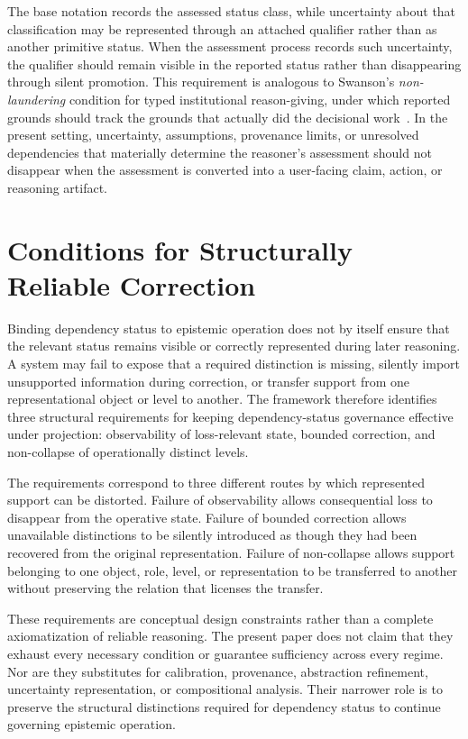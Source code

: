 \documentclass[11pt]{article}
\theoremstyle{definition}
\theoremstyle{remark}
\begin{document}
The base notation records the assessed status class, while uncertainty about that classification may be represented through an attached qualifier rather than as another primitive status. When the assessment process records such uncertainty, the qualifier should remain visible in the reported status rather than disappearing through silent promotion. This requirement is analogous to Swanson's \emph{non-laundering} condition for typed institutional reason-giving, under which reported grounds should track the grounds that actually did the decisional work~\cite{Swanson2026Typed}. In the present setting, uncertainty, assumptions, provenance limits, or unresolved dependencies that materially determine the reasoner's assessment should not disappear when the assessment is converted into a user-facing claim, action, or reasoning artifact.

\section{Conditions for Structurally Reliable Correction}

Binding dependency status to epistemic operation does not by itself ensure that the relevant status remains visible or correctly represented during later reasoning. A system may fail to expose that a required distinction is missing, silently import unsupported information during correction, or transfer support from one representational object or level to another. The framework therefore identifies three structural requirements for keeping dependency-status governance effective under projection: observability of loss-relevant state, bounded correction, and non-collapse of operationally distinct levels.

The requirements correspond to three different routes by which represented support can be distorted. Failure of observability allows consequential loss to disappear from the operative state. Failure of bounded correction allows unavailable distinctions to be silently introduced as though they had been recovered from the original representation. Failure of non-collapse allows support belonging to one object, role, level, or representation to be transferred to another without preserving the relation that licenses the transfer.

These requirements are conceptual design constraints rather than a complete axiomatization of reliable reasoning. The present paper does not claim that they exhaust every necessary condition or guarantee sufficiency across every regime. Nor are they substitutes for calibration, provenance, abstraction refinement, uncertainty representation, or compositional analysis. Their narrower role is to preserve the structural distinctions required for dependency status to continue governing epistemic operation.
\end{document}
